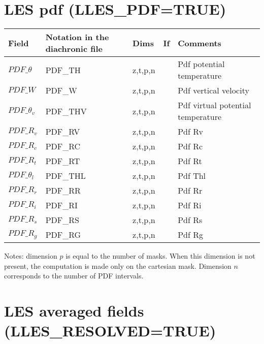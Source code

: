 \section{LES pdf (LLES\_PDF=TRUE)}

\begingroup
\renewcommand\arraystretch{1.5}
\begin{longtable}[c]{|p{}|p{}|p{}|p{}|p{}|}
\hline
Field & Notation in the diachronic file & Dims & If  & Comments \\
\hline \hline
\endhead
$PDF\_\theta$   & PDF\_TH  & z,t,p,n &   & Pdf potential temperature \\\hline
$PDF\_W$        & PDF\_W   & z,t,p,n &   & Pdf vertical velocity \\\hline
$PDF\_\theta_v$ & PDF\_THV & z,t,p,n &   & Pdf virtual potential temperature \\\hline
$PDF\_R_v$      & PDF\_RV  & z,t,p,n &   & Pdf Rv \\\hline
$PDF\_R_c$      & PDF\_RC  & z,t,p,n &   & Pdf Rc \\\hline
$PDF\_R_t$      & PDF\_RT  & z,t,p,n &   & Pdf Rt \\\hline
$PDF\_\theta_l$ & PDF\_THL & z,t,p,n &   & Pdf Thl \\\hline
$PDF\_R_r$      & PDF\_RR  & z,t,p,n &   & Pdf Rr \\\hline
$PDF\_R_i$      & PDF\_RI  & z,t,p,n &   & Pdf Ri \\\hline
$PDF\_R_s$      & PDF\_RS  & z,t,p,n &   & Pdf Rs \\\hline
$PDF\_R_g$      & PDF\_RG  & z,t,p,n &   & Pdf Rg\\\hline
\end{longtable}
\endgroup

Notes: dimension $p$ is equal to the number of masks. When this dimension is not present, the computation is made only on the cartesian mask. Dimension $n$ corresponds to the number of PDF intervals.


\section{LES averaged fields (LLES\_RESOLVED=TRUE)}

